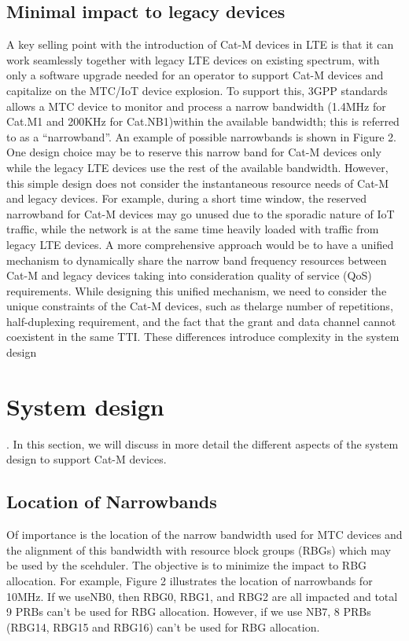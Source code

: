 \documentclass[conference,compsoc]{IEEEtran}
\begin{document}
\subsection{Minimal impact to legacy devices}
A key selling point with the introduction of Cat-M devices in LTE is that it can work seamlessly together with legacy LTE devices on existing spectrum, with only a software upgrade needed for an operator to support Cat-M devices and capitalize on the MTC/IoT device explosion. To support this, 3GPP standards allows a MTC device to monitor and process a narrow bandwidth (1.4MHz for Cat.M1 and 200KHz for Cat.NB1)within the available bandwidth; this is referred to as a “narrowband”. An example of possible narrowbands is shown in Figure 2. One design choice may be to reserve this narrow band for Cat-M devices only while the legacy LTE devices use the rest of the available bandwidth. However, this simple design does not consider the instantaneous resource needs of Cat-M and legacy devices. For example, during a short time window, the reserved narrowband for Cat-M devices may go unused due to the sporadic nature of IoT traffic, while the network is at the same time heavily loaded with traffic from legacy LTE devices. A more comprehensive approach would be to have a unified mechanism to dynamically share the narrow band frequency resources between Cat-M and legacy devices taking into consideration quality of service (QoS) requirements. While designing this unified mechanism, we need to consider the unique constraints of the Cat-M devices, such as thelarge number of repetitions, half-duplexing requirement, and the fact that the grant and data channel cannot coexistent in the same TTI. These differences introduce complexity in the system design

\section{System design}
.   In this section, we will discuss in more detail the different aspects of the system design to support Cat-M devices.

\subsection{Location of Narrowbands}
Of importance is  the location of the narrow bandwidth used for MTC devices and the alignment of this bandwidth with resource block groups (RBGs) which may be used by the scehduler. The objective is to minimize the impact to RBG allocation.  For example, Figure 2 illustrates the location of narrowbands for 10MHz. If we useNB0, then RBG0, RBG1, and RBG2 are all impacted and total 9 PRBs can’t be used for RBG allocation. However, if we use NB7, 8 PRBs (RBG14, RBG15 and RBG16) can’t be used for RBG allocation.
\end{document}
